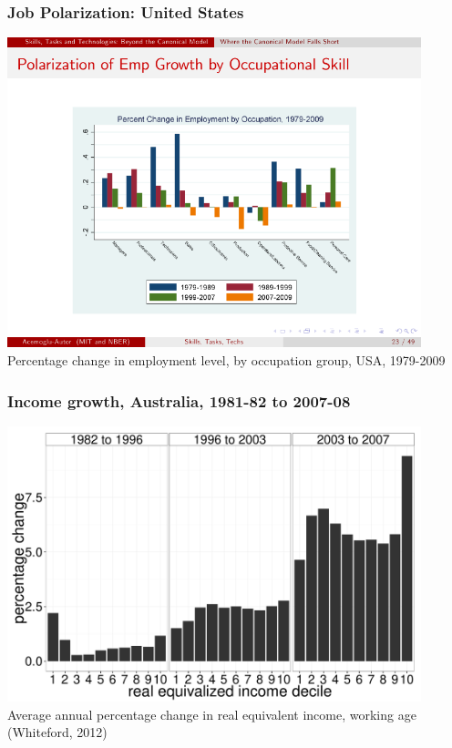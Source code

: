\documentclass[red]{beamer}
\begin{document}
\begin{frame}
  \frametitle{Job Polarization: United States}
  \begin{center}
  \includegraphics[width=0.9\textwidth]{slides_fig/level_by_occ.pdf} \\
  Percentage change in employment level, by occupation group, USA, 1979-2009 \citep{Acemoglu2011}
  \end{center}
\end{frame}

\begin{frame}
  \frametitle{Income growth, Australia, 1981-82 to 2007-08}
  \begin{center}
  \includegraphics[width=0.9\textwidth]{slides_fig/figure_wage_deciles.pdf} \\
  Average annual percentage change in real equivalent income, working age (Whiteford, 2012)
  \end{center}
\end{frame}
\end{document}

